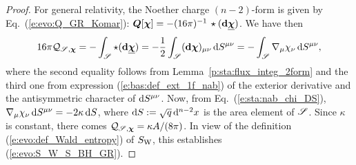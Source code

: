 \begin{proof}
For general relativity, the Noether charge $(n-2)$-form is given by Eq.~(\ref{e:evo:Q_GR_Komar}):
$\bm{Q}[\bm{\chi}] = - (16\pi)^{-1}\, \star (\mathbf{d} \underline{\bm{\chi}})$. We have then
\[
   16\pi  \mathcal{Q}_{\mathscr{S},\bm{\chi}} = - \int_{\mathscr{S}}  \star (\mathbf{d} \underline{\bm{\chi}})
    = - \frac{1}{2} \int_{\mathscr{S}} (\mathbf{d}\bm{\chi})_{\mu\nu} \, \mathrm{d} S^{\mu\nu}
    = - \int_{\mathscr{S}} \nabla_\mu \chi_\nu  \, \mathrm{d} S^{\mu\nu} ,
\]
where the second equality follows from Lemma~\ref{p:sta:flux_integ_2form}
and the third one from expression (\ref{e:bas:def_ext_1f_nab}) of the exterior
derivative and the antisymmetric character of $\mathrm{d} S^{\mu\nu}$.
Now, from Eq.~(\ref{e:sta:nab_chi_DS}),
$\nabla_\mu \chi_\nu  \, \mathrm{d} S^{\mu\nu} = -2 \kappa \, \mathrm{d} S$,
where $\mathrm{d} S := \sqrt{q}\, \mathrm{d}^{n-2} x$ is the area element of $\mathscr{S}$. Since $\kappa$
is constant, there comes $\mathcal{Q}_{\mathscr{S},\bm{\chi}}  = \kappa A/(8\pi)$.
In view of the definition (\ref{e:evo:def_Wald_entropy}) of $S_{\rm W}$,
this establishes (\ref{e:evo:S_W_S_BH_GR}).
\end{proof}

